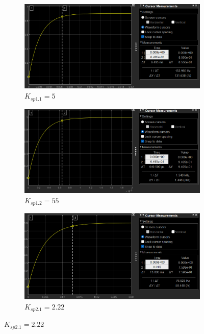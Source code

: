 \documentclass[12pt, a4paper]{report}
\begin{document}
\begin{figure}[H]
    \begin{subfigure}[h!]{0.4\linewidth}
        \includegraphics[width=\linewidth]{s1simk5tr.png}
        \caption{$K_{sp1.1} = 5$}
    \end{subfigure}
    \hfill
    \begin{subfigure}[h!]{0.4\linewidth}
        \includegraphics[width=\linewidth]{s1simk55tr.png}
        \caption{$K_{sp1.2} = 55$}
    \end{subfigure}
    \hfill
    \begin{subfigure}[h!]{0.4\linewidth}
        \includegraphics[width=\linewidth]{s1sim2tr.png}
        \caption{$K_{sp2.1} = 2.22$}

\end{subfigure}
\end{figure}
\end{document}
